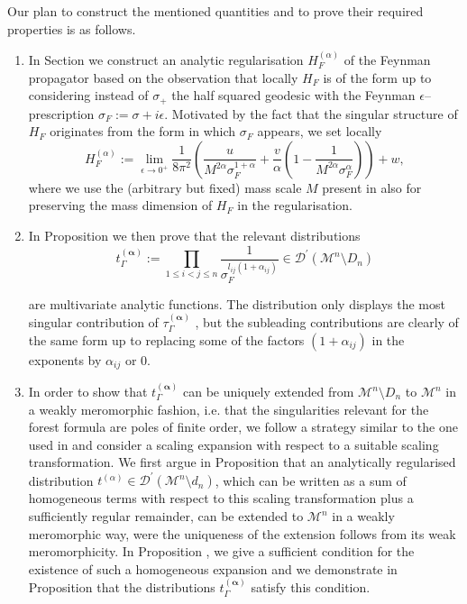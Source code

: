 \documentclass[10pt]{book}
\newcommand{\Dcal}{\mathcal{D}}
\newcommand{\Mcal}{\mathcal{M}}
\theoremstyle{break}
\begin{document}
Our plan to construct the mentioned quantities and to prove their required properties is as follows.

\begin{enumerate}
\item In Section %
we construct an analytic regularisation $H^{(\alpha)}_F$ of the Feynman propagator based on the observation that locally $H_F$ is of the form %
up to considering instead of $\sigma_+$ the half squared geodesic with the Feynman $\epsilon$--prescription $\sigma_F := \sigma + i\epsilon$. Motivated by the fact that the singular structure of $H_F$ originates from the form in which $\sigma_F$ appears, we set locally
%
\begin{equation}
H^{(\alpha)}_F := \lim_{\epsilon\to 0^+} \frac{1}{8\pi^2}\left(\frac{u}{M^{2\alpha}\sigma_F^{1+\alpha}} + \frac{v}{\alpha} \left(1-\frac{1}{M^{2\alpha}\sigma_F^{\alpha}}\right)\right)+w,
\end{equation}
%
where we use the (arbitrary but fixed) mass scale $M$ present in %
also for preserving the mass dimension of $H_F$ in the regularisation.
\item In Proposition %
we then prove that the relevant distributions
%
\begin{equation}
t_\Gamma^{(\boldsymbol{\alpha})} := \prod_{1\le i<j\le n} \frac{1}{\sigma_F^{l_{ij}(1+\alpha_{ij})}}\in \Dcal^\prime(\Mcal^n\setminus D_n)
\end{equation}

%
are multivariate analytic functions. The distribution %
only displays the most singular contribution of $\tau^{(\boldsymbol{\alpha})}_\Gamma$ %
, but the subleading contributions are clearly of the same form up to replacing some of the factors $(1+\alpha_{ij})$ in the exponents by $\alpha_{ij}$ or 0.
\item In order to show that $t_\Gamma^{(\boldsymbol{\alpha})}$ can be uniquely extended from $\Mcal^n\setminus D_n$ to $\Mcal^n$ in a weakly meromorphic fashion, i.e. that the singularities relevant for the forest formula are poles of finite order, we follow a strategy similar to the one used in %
and consider a scaling expansion with respect to a suitable scaling transformation. We first argue in Proposition %
that an analytically regularised distribution $t^{(\alpha)}\in\Dcal^\prime(\Mcal^n\setminus d_n)$, which can be written as a sum of homogeneous terms with respect to this scaling transformation plus a sufficiently regular remainder, can be extended to $\Mcal^n$ in a weakly meromorphic way, were the uniqueness of the extension follows from its weak meromorphicity. In Proposition %
, we give a sufficient condition for the existence of such a homogeneous expansion and we demonstrate in Proposition %
that the distributions $t_\Gamma^{(\boldsymbol{\alpha})}$ satisfy this 
condition.


\end{enumerate}
\end{document}
